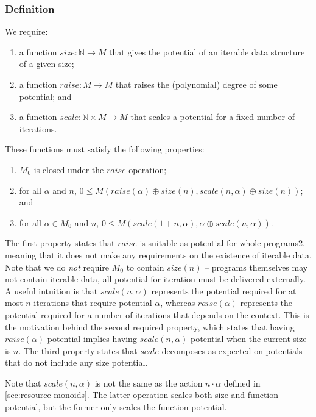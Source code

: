 \documentclass[acmsmall,review,screen,anonymous]{acmart}
\begin{document}
\subsubsection{Definition}
We require:
\begin{enumerate}
\item a function $\mathit{size} : \mathbb{N} \to M$ that gives the
  potential of an iterable data structure of a given
  size;
\item a function $\mathit{raise} : M \to M$ that raises the
  (polynomial) degree of some potential; and
\item a function $\mathit{scale} : \mathbb{N} \times M \to M$ that
  scales a potential for a fixed number of iterations.
\end{enumerate}
These functions must satisfy the following properties:
\begin{enumerate}
\item $M_0$ is closed under the $\mathit{raise}$ operation;
\item for all $\alpha$ and $n$,
  $0 \leq M(\mathit{raise}(\alpha) \oplus \mathit{size}(n),
  \mathit{scale}(n,\alpha) \oplus \mathit{size}(n))$; and
\item for all $\alpha \in M_0$ and $n$,
  $0 \leq M(\mathit{scale}(1 + n, \alpha), \alpha \oplus
  \mathit{scale}(n, \alpha))$.
\end{enumerate}
The first property states that $\mathit{raise}$ is suitable as
potential for whole programs2, meaning that it does not make any
requirements on the existence of iterable data. Note that we do
\emph{not} require $M_0$ to contain $\mathit{size}(n)$ -- programs
themselves may not contain iterable data, all potential for iteration
must be delivered externally. A useful intuition is that
$\mathit{scale}(n,\alpha)$ represents the potential required for at
most $n$ iterations that require potential $\alpha$, whereas
$\mathit{raise}(\alpha)$ represents the potential required for a
number of iterations that depends on the context. This is the
motivation behind the second required property, which states that
having $\mathit{raise}(\alpha)$ potential implies having
$\mathit{scale}(n,\alpha)$ potential when the current size is $n$. The
third property states that $\mathit{scale}$ decomposes as expected on
potentials that do not include any size potential.

Note that $\mathit{scale}(n,\alpha)$ is not the same as the action
$n \cdot \alpha$ defined in \autoref{sec:resource-monoids}. The latter
operation scales both size and function potential, but the former only
scales the function potential.
\end{document}
